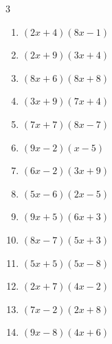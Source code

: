 \begin{multicols}{3}
\begin{enumerate}
  \item $(2x+4)(8x-1)$


  \item $(2x+9)(3x+4)$


  \item $(8x+6)(8x+8)$


  \item $(3x+9)(7x+4)$


  \item $(7x+7)(8x-7)$


  \item $(9x-2)(x-5)$


  \item $(6x-2)(3x+9)$


\columnbreak %

\resetques

  \item $(5x-6)(2x-5)$


  \item $(9x+5)(6x+3)$


  \item $(8x-7)(5x+3)$


  \item $(5x+5)(5x-8)$


  \item $(2x+7)(4x-2)$


  \item $(7x-2)(2x+8)$


  \item $(9x-8)(4x+6)$



\end{enumerate}
\end{multicols}
